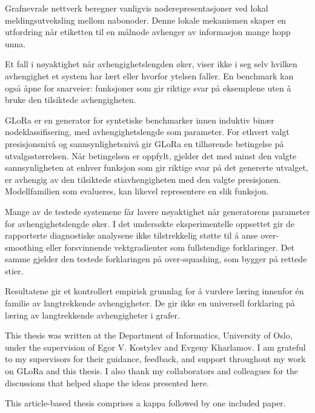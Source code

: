 \documentclass[UKenglish, thumbmarks]{uiophdthesis}
\begin{document}
\begin{xabstract}[Sammendrag]
Grafnevrale nettverk beregner vanligvis noderepresentasjoner ved lokal meldingsutveksling mellom nabonoder.
Denne lokale mekanismen skaper en utfordring når etiketten til en målnode avhenger av informasjon mange hopp unna.

Et fall i nøyaktighet når avhengighetslengden øker, viser ikke i seg selv hvilken avhengighet et system har lært eller hvorfor ytelsen faller.
En benchmark kan også åpne for snarveier: funksjoner som gir riktige svar på eksemplene uten å bruke den tilsiktede avhengigheten.

GLoRa er en generator for syntetiske benchmarker innen induktiv binær nodeklassifisering, med avhengighetslengde som parameter.
For ethvert valgt presisjonsnivå og sannsynlighetsnivå gir GLoRa en tilhørende betingelse på utvalgsstørrelsen.
Når betingelsen er oppfylt, gjelder det med minst den valgte sannsynligheten at enhver funksjon som gir riktige svar på det genererte utvalget, er avhengig av den tilsiktede stiavhengigheten med den valgte presisjonen.
Modellfamilien som evalueres, kan likevel representere en slik funksjon.

Mange av de testede systemene får lavere nøyaktighet når generatorens parameter for avhengighetslengde øker.
I det undersøkte eksperimentelle oppsettet gir de rapporterte diagnostiske analysene ikke tilstrekkelig støtte til å anse over-smoothing eller forsvinnende vektgradienter som fullstendige forklaringer.
Det samme gjelder den testede forklaringen på over-squashing, som bygger på rettede stier.

Resultatene gir et kontrollert empirisk grunnlag for å vurdere læring innenfor én familie av langtrekkende avhengigheter.
De gir ikke en universell forklaring på læring av langtrekkende avhengigheter i grafer.
\end{xabstract}

\begin{preface}
This thesis was written at the Department of Informatics, University of Oslo, under the supervision of Egor V. Kostylev and Evgeny Kharlamov.
I am grateful to my supervisors for their guidance, feedback, and support throughout my work on GLoRa and this thesis.
I also thank my collaborators and colleagues for the discussions that helped shape the ideas presented here.

This article-based thesis comprises a kappa followed by one included paper.
\end{preface}
\end{document}

